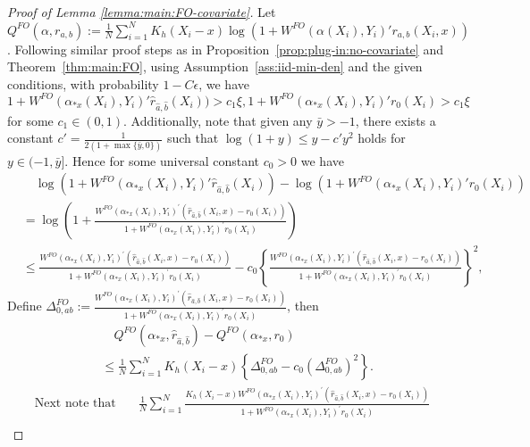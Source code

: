 \documentclass[10pt,a4paper]{amsart}
\begin{document}
\begin{proof}[Proof of Lemma \ref{lemma:main:FO-covariate}]
Let $Q^{FO}(\alpha,r_{a,b}):= \frac{1}{N}\sum_{i=1}^N K_h(X_i-x)\log(1+ W^{FO}(\alpha(X_i),Y_i)'r_{a,b}(X_i,x))$. 
Following similar proof steps as in Proposition~\ref{prop:plug-in:no-covariate} and Theorem~\ref{thm:main:FO}, using Assumption~\ref{ass:iid-min-den} and the given conditions, with probability $1-C\epsilon$, we have 
$$1 +  W^{FO}(\alpha_{*x}(X_i),Y_i)'\hat r_{\hat a,\hat b}(X_i))>c_1\xi, 1 + W^{FO}(\alpha_{*x}(X_i),Y_i)' r_0(X_i)>c_1\xi$$ 
for some $c_1\in(0,1)$. Additionally, note that given any $\bar{y}>-1$, there exists a constant $c'=\frac{1}{2(1+\max\{\bar{y},0\})}$ such that $\log(1+y)\leq y-c'y^2$ holds for $y\in(-1,\bar{y}]$. Hence for some universal constant $c_0>0$ we have 
$$\begin{array}{rl}
       &\displaystyle\quad \log ( 1 +  W^{FO}(\alpha_{*x}(X_i),Y_i)'\hat r_{\hat a,\hat b}(X_i))   -\log( 1 + W^{FO}(\alpha_{*x}(X_i),Y_i)' r_0(X_i)) \\
       &\displaystyle=\log\left(1+\frac{ W^{FO}(\alpha_{*x}(X_i),Y_i)^\prime(\hat{r}_{\hat a,\hat b}(X_i,x)-r_0(X_i))}{1+ W^{FO}(\alpha_{*x}(X_i),Y_i)^\prime r_0(X_i)}\right)\\
       &\displaystyle\leq\frac{ W^{FO}(\alpha_{*x}(X_i),Y_i)^\prime(\hat{r}_{\hat a,\hat b}(X_i,x)-r_0(X_i))}{1+W^{FO}(\alpha_{*x}(X_i),Y_i)^\prime r_0(X_i)}-c_0\left\{\frac{W^{FO}(\alpha_{*x}(X_i),Y_i)^\prime(\hat{r}_{\hat a,\hat b}(X_i,x)-r_0(X_i))}{1+W^{FO}(\alpha_{*x}(X_i),Y_i)^\prime r_0(X_i)}\right\}^2,
\end{array}$$
Define $\Delta_{0,ab}^{FO}:=\frac{W^{FO}(\alpha_{*x}(X_i),Y_i)^\prime(\hat{r}_{\hat a, \hat b}(X_i,x)-r_0(X_i))}{1+W^{FO}(\alpha_{*x}(X_i),Y_i)^\prime r_0(X_i)}$, then 
\begin{equation}\label{eq:covariate:quadratic:Q}
\begin{array}{rl} 
&\quad \displaystyle Q^{FO}(\alpha_{*x},\hat r_{\hat a,\hat b})-Q^{FO}(\alpha_{*x}, r_0)  \\
&\displaystyle \leq \frac{1}{N}\sum_{i=1}^N K_h(X_i-x)\left\{\Delta_{0,ab}^{FO}-c_0(\Delta_{0,ab}^{FO})^2\right\}.
\end{array}
\end{equation}
$$\begin{array}{rl}
\mbox{Next note that}&\displaystyle\quad \frac{1}{N}\sum_{i=1}^N \frac{K_h(X_i-x)W^{FO}(\alpha_{*x}(X_i),Y_i)^\prime(\hat{r}_{\hat a,\hat b}(X_i,x)-r_0(X_i))}{1+W^{FO}(\alpha_{*x}(X_i),Y_i)^\prime r_0(X_i)} \\

\end{array}$$
\end{proof}
\end{document}
